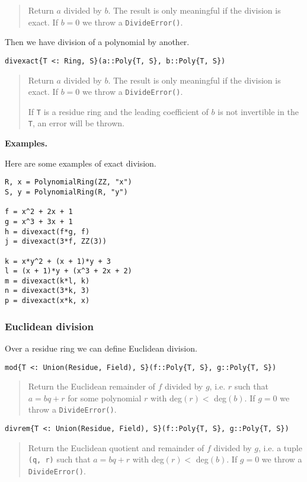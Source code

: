 \documentclass[a4paper,10pt]{article}
\newcommand{\code}{\lstinline}
\newcommand{\desc}[1]{\vspace{-3mm}\begin{quote}#1\end{quote}}
\begin{document}
{{\desc{Return $a$ divided by $b$. The result is only meaningful if the division is
exact. If $b = 0$ we throw a \code{DivideError()}.}

Then we have division of a polynomial by another.

\begin{lstlisting}
divexact{T <: Ring, S}(a::Poly{T, S}, b::Poly{T, S})
\end{lstlisting}

\desc{Return $a$ divided by $b$. The result is only meaningful if the division is
exact. If $b = 0$ we throw a \code{DivideError()}. 

If \code{T} is a residue ring and the leading coefficient of $b$ is not invertible
in the \code{T}, an error will be thrown.} 

\textbf{Examples.}

Here are some examples of exact division.

\begin{lstlisting}
R, x = PolynomialRing(ZZ, "x")
S, y = PolynomialRing(R, "y")

f = x^2 + 2x + 1
g = x^3 + 3x + 1
h = divexact(f*g, f)
j = divexact(3*f, ZZ(3))

k = x*y^2 + (x + 1)*y + 3
l = (x + 1)*y + (x^3 + 2x + 2)
m = divexact(k*l, k)
n = divexact(3*k, 3)
p = divexact(x*k, x)
\end{lstlisting}

\subsubsection{Euclidean division}

Over a residue ring we can define Euclidean division.

\begin{lstlisting}
mod{T <: Union(Residue, Field), S}(f::Poly{T, S}, g::Poly{T, S})
\end{lstlisting}

\desc{Return the Euclidean remainder of $f$ divided by $g$, i.e. $r$ such 
that $a = bq + r$ for some polynomial $r$ with deg$(r) <$ deg$(b)$. If 
$g = 0$ we throw a \code{DivideError()}.}

\begin{lstlisting}
divrem{T <: Union(Residue, Field), S}(f::Poly{T, S}, g::Poly{T, S})
\end{lstlisting}

\desc{Return the Euclidean quotient and remainder of $f$ divided by $g$, i.e.
a tuple \code{(q, r)} such that $a = bq + r$ with deg$(r) <$ deg$(b)$. If 
$g = 0$ we throw a \code{DivideError()}.}

}}
\end{document}
